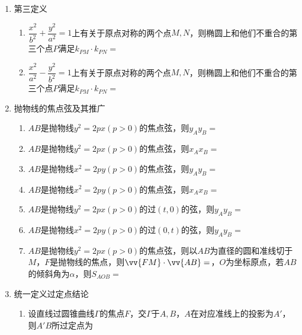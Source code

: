 \begin{enumerate}
\begin{enumerate}
        \item 若$P(x_0, y_0)$满足$\dfrac{x_0^2}{a^2}-\dfrac{y_0^2}{b^2} > 1$，则$\dfrac{x_0x}{a^2}-\dfrac{y_0y}{b^2} = 1$和$\dfrac{x^2}{a^2}-\dfrac{y^2}{b^2} = 1$的位置关系为
    \end{enumerate}
    \item 第三定义
    \begin{enumerate}
        \item $\dfrac{x^2}{b^2}+\dfrac{y^2}{a^2} = 1$上有关于原点对称的两个点$M,N$，则椭圆上和他们不重合的第三个点$P$满足$k_{PM} \cdot k_{PN} = $
        \item $\dfrac{x^2}{a^2}-\dfrac{y^2}{b^2} = 1$上有关于原点对称的两个点$M,N$，则椭圆上和他们不重合的第三个点$P$满足$k_{PM} \cdot k_{PN} = $
    \end{enumerate}
    \item 抛物线的焦点弦及其推广
    \begin{enumerate}
        \item $AB$是抛物线$y^2 = 2px(p>0)$的焦点弦，则$y_Ay_B = $
        \item $AB$是抛物线$y^2 = 2px(p>0)$的焦点弦，则$x_Ax_B = $
        \item $AB$是抛物线$x^2 = 2py(p>0)$的焦点弦，则$y_Ay_B = $
        \item $AB$是抛物线$x^2 = 2py(p>0)$的焦点弦，则$x_Ax_B = $
        \item $AB$是抛物线$y^2 = 2px(p>0)$的过$(t, 0)$的弦，则$y_Ay_B = $\blkda[3]{$-2pt$}
        \item $AB$是抛物线$x^2 = 2py(p>0)$的过$(0, t)$的弦，则$y_Ay_B = $
        \item $AB$是抛物线$y^2 = 2px(p>0)$的焦点弦，则以$AB$为直径的圆和准线切于$M$，$F$是抛物线的焦点，则$\vv{FM} \cdot \vv{AB} = $，$O$为坐标原点，若$AB$的倾斜角为$\alpha$，则$S_{AOB} = $
    \end{enumerate}
    \item 统一定义过定点结论
    \begin{enumerate}
        \item 设直线过圆锥曲线$\Gamma$的焦点$F$，交$\Gamma$于$A, B$，$A$在对应准线上的投影为$A'$，则$A'B$所过定点为
    \end{enumerate}
\end{enumerate}